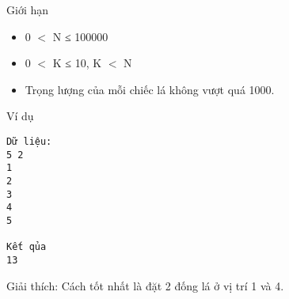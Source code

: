 Giới hạn
\begin{itemize}
	\item     0 $<$ N ≤ 100000   
	\item     0 $<$ K ≤ 10, K $<$ N   
	\item     Trọng lượng của mỗi chiếc lá không vượt quá 1000.   
\end{itemize}
Ví dụ
\begin{verbatim}
Dữ liệu:
5 2
1
2
3
4
5

Kết qủa
13
\end{verbatim}

   Giải thích: Cách tốt nhất là đặt 2 đống lá ở vị trí 1 và 4.